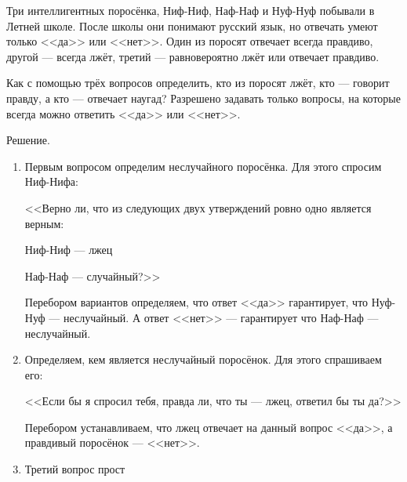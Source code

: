 \documentclass[12pt,a4paper]{article}
\begin{document}
Три интеллигентных поросёнка, Ниф-Ниф, Наф-Наф и Нуф-Нуф побывали в Летней школе. После школы они понимают русский язык, но отвечать умеют только <<да>> или <<нет>>. Один из поросят отвечает всегда правдиво, другой --- всегда лжёт, третий --- равновероятно лжёт или отвечает правдиво.

Как с помощью трёх вопросов определить, кто из поросят лжёт, кто --- говорит правду, а кто --- отвечает наугад? Разрешено задавать только вопросы, на которые всегда можно ответить <<да>> или <<нет>>.


Решение.

\begin{enumerate}


\item Первым вопросом определим неслучайного поросёнка. Для этого спросим Ниф-Нифа:

<<Верно ли, что из следующих двух утверждений ровно одно является верным:

Ниф-Ниф --- лжец

Наф-Наф --- случайный?>>


Перебором вариантов определяем, что ответ <<да>> гарантирует, что Нуф-Нуф --- неслучайный. А ответ <<нет>> --- гарантирует что Наф-Наф --- неслучайный. 

\item Определяем, кем является неслучайный поросёнок. Для этого спрашиваем его:

<<Если бы я спросил тебя, правда ли, что ты --- лжец, ответил бы ты да?>>

Перебором устанавливаем, что лжец отвечает на данный вопрос <<да>>, а правдивый поросёнок --- <<нет>>.

\item Третий вопрос прост

\end{enumerate}
\end{document}
